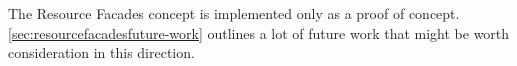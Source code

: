 \documentclass[11pt,a4paper,headsepline,twoside]{scrartcl}		%
\begin{document}
The Resource Facades concept is implemented only as a proof of
concept. \autoref{sec:resourcefacadesfuture-work} outlines a lot of future work
that might be worth consideration in this direction.






\end{document}
